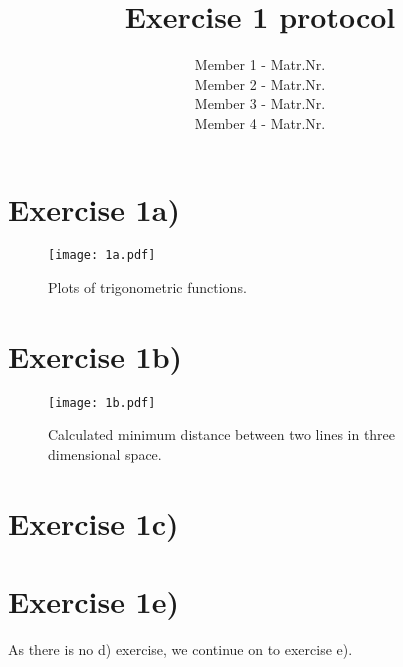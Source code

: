 \documentclass[10pt,a4paper]{article}
\title{Exercise 1 protocol}
\author{Member 1 - Matr.Nr. \\
Member 2 - Matr.Nr. \\
Member 3 - Matr.Nr. \\
Member 4 - Matr.Nr.}
\begin{document}
	\maketitle
	\section*{Exercise 1a)}
	
	
	\begin{figure}[H]
		\texttt{[image: 1a.pdf]}
		\caption{Plots of trigonometric functions.}
		\label{fig:1a}
	\end{figure}
	
	\section*{Exercise 1b)}
	
	
	\begin{figure}[H]
		\texttt{[image: 1b.pdf]}
		\caption{Calculated minimum distance between two lines in three dimensional space.}
		\label{fig:ab}
	\end{figure}
	
	\section*{Exercise 1c)}
	
	\section*{Exercise 1e)}
	As there is no d) exercise, we continue on to exercise e).
	
\end{document}
